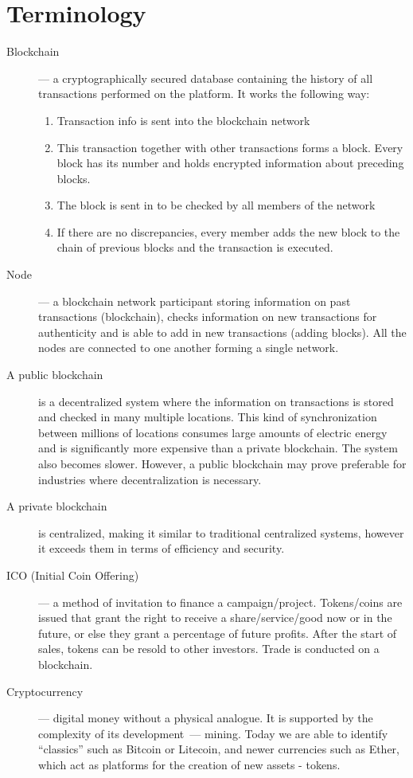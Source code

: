 \documentclass{article}
\begin{document}
\section{Terminology}
\begin{description}
\item[Blockchain]--- a cryptographically secured database containing the history of all transactions performed on the platform. It works the following way:
\begin{enumerate}
\item Transaction info is sent into the blockchain network
\item This transaction together with other transactions forms a block. Every block has its number and holds encrypted information about preceding blocks. 
\item The block is sent in to be checked by all members of the network
\item If there are no discrepancies, every member adds the new block to the chain of previous blocks and the transaction is executed. 
\end{enumerate}
\item[Node]--- a blockchain network participant storing information on past transactions (blockchain), checks information on new transactions for authenticity and is able to add in new transactions (adding blocks). All the nodes are connected to one another forming a single network. 
\item[A public blockchain] is a decentralized system where the information on transactions is stored and checked in many multiple locations. This kind of synchronization between millions of locations consumes large amounts of electric energy and is significantly more expensive than a private blockchain. The system also becomes slower. However, a public blockchain may prove preferable for industries where decentralization is necessary. 
\item[A private blockchain] is centralized, making it similar to traditional centralized systems, however it exceeds them in terms of efficiency and security.
\item[ICO (Initial Coin Offering)]--- a method of invitation to finance a campaign/project. Tokens/coins are issued that grant the right to receive a share/service/good now or in the future, or else they grant a percentage of future profits. After the start of sales, tokens can be resold to other investors. Trade is conducted on a blockchain. 
\item[Cryptocurrency]--- digital money without a physical analogue. It is supported by the complexity of its development~--- mining. Today we are able to identify \enquote{classics} such as Bitcoin or Litecoin, and newer currencies such as Ether, which act as platforms for the creation of new assets - tokens.

\end{description}
\end{document}
